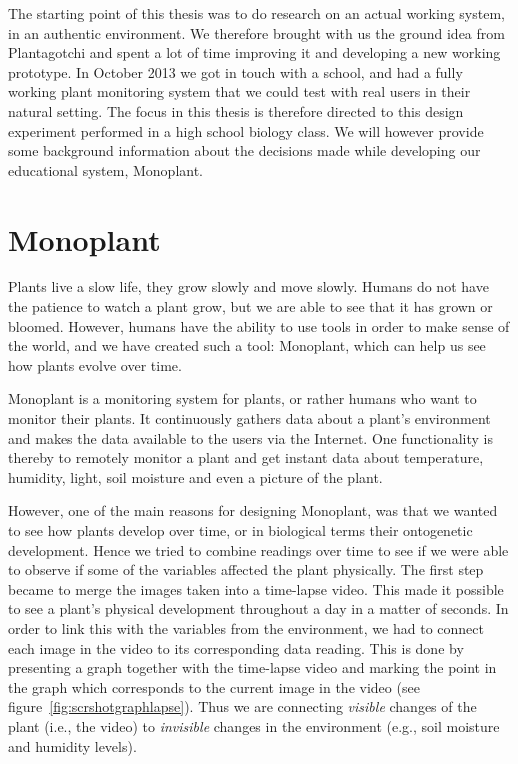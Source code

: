 The starting point of this thesis was to do research on an actual working system, in an authentic environment. We therefore brought with us the ground idea from Plantagotchi and spent a lot of time improving it and developing a new working prototype. In October 2013 we got in touch with a school, and had a fully working plant monitoring system that we could test with real users in their natural setting. The focus in this thesis is therefore directed to this design experiment performed in a high school biology class. We will however provide some background information about the decisions made while developing our educational system, Monoplant. 


\section{Monoplant}
Plants live a slow life, they grow slowly and move slowly. Humans do not have the patience to watch a plant grow, but we are able to see that it has grown or bloomed. However, humans have the ability to use tools in order to make sense of the world, and we have created such a tool: Monoplant, which can help us see how plants evolve over time.

Monoplant is a monitoring system for plants, or rather humans who want to monitor their plants. It continuously gathers data about a plant's environment and makes the data available to the users via the Internet. One functionality is thereby to remotely monitor a plant and get instant data about temperature, humidity, light, soil moisture and even a picture of the plant. 

However, one of the main reasons for designing Monoplant, was that we wanted to see how plants develop over time, or in biological terms their ontogenetic development. Hence we tried to combine readings over time to see if we were able to observe if some of the variables affected the plant physically. The first step became to merge the images taken into a time-lapse video. This made it possible to see a plant's physical development throughout a day in a matter of seconds. In order to link this with the variables from the environment, we had to connect each image in the video to its corresponding data reading. This is done by presenting a graph together with the time-lapse video and marking the point in the graph which corresponds to the current image in the video (see figure~\ref{fig:scrshotgraphlapse}). Thus we are connecting \emph{visible} changes of the plant (i.e., the video) to \emph{invisible} changes in the environment (e.g., soil moisture and humidity levels).


